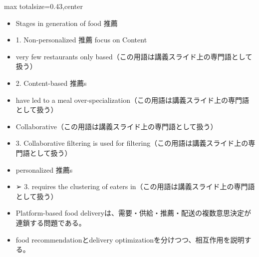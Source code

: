 \clearpage
{}
\begin{minipage}[t]{0.405\textwidth}
\begin{adjustbox}{max totalsize={\textwidth}{0.43\textheight},center}
\begin{minipage}{\textwidth}\scriptsize
{}\begin{itemize}
\item Stages in generation of food 推薦
\item 1. Non-personalized 推薦 focus on Content
\item very few restaurants only based（この用語は講義スライド上の専門語として扱う）
\item 2. Content-based 推薦s
\item have led to a meal over-specialization（この用語は講義スライド上の専門語として扱う）
\item Collaborative（この用語は講義スライド上の専門語として扱う）
\item 3. Collaborative filtering is used for filtering（この用語は講義スライド上の専門語として扱う）
\item personalized 推薦s
\item ➢ 3. requires the clustering of eaters in（この用語は講義スライド上の専門語として扱う）
\end{itemize}\begin{itemize}
\item Platform-based food deliveryは、需要・供給・推薦・配送の複数意思決定が連鎖する問題である。
\item food recommendationとdelivery optimizationを分けつつ、相互作用を説明する。
\end{itemize}
\end{minipage}
\end{adjustbox}
\end{minipage}\hfill

